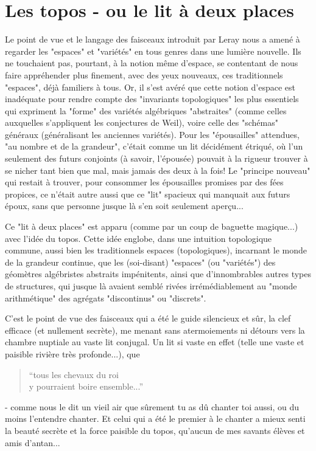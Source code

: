 \section{Les topos - ou le lit à deux places}

Le point de vue et le langage des faisceaux introduit par Leray nous a amené à regarder les "espaces" et "variétés" en tous genres dans une lumière nouvelle. Ils ne touchaient pas, pourtant, à la notion même d'espace, se contentant de nous faire appréhender plus finement, avec des yeux nouveaux, ces traditionnels "espaces", déjà familiers à tous. Or, il s'est avéré que cette notion d'espace est inadéquate pour rendre compte des "invariants topologiques" les plus essentiels qui expriment la "forme" des variétés algébriques "abstraites" (comme celles auxquelles s'appliquent les conjectures de Weil), voire celle des "schémas" généraux (généralisant les anciennes variétés). Pour les "épousailles" attendues, "au nombre et de la grandeur", c'était comme un lit décidément étriqué, où l'un seulement des futurs conjoints (à savoir, l'épousée) pouvait à la rigueur trouver à se nicher tant bien que mal, mais jamais des deux à la fois! Le "principe nouveau" qui restait à trouver, pour consommer les épousailles promises par des fées propices, ce n'était autre aussi que ce "lit" spacieux qui manquait aux futurs époux, sans que personne jusque là s'en soit seulement aperçu...

Ce "lit à deux places" est apparu (comme par un coup de baguette magique...) avec l'idée du topos. Cette idée englobe, dans une intuition topologique commune, aussi bien les traditionnels espaces (topologiques), incarnant le monde de la grandeur continue, que les (soi-disant) "espaces" (ou "variétés") des géomètres algébristes abstraits impénitents, ainsi que d'innombrables autres types de structures, qui jusque là avaient semblé rivées irrémédiablement au "monde arithmétique" des agrégats "discontinus" ou "discrets".

C'est le point de vue des faisceaux qui a été le guide silencieux et sûr, la clef efficace (et nullement secrète), me menant sans atermoiements ni détours vers la chambre nuptiale au vaste lit conjugal. Un lit si vaste en effet (telle une vaste et paisible rivière très profonde...), que
\begin{quote}
    ``tous les chevaux du roi\\
    y pourraient boire ensemble...''
    \end{quote}
- comme nous le dit un vieil air que sûrement tu as dû chanter toi aussi, ou du moins l'entendre chanter. Et celui qui a été le premier à le chanter a mieux senti la beauté secrète et la force paisible du topos, qu'aucun de mes savants élèves et amis d'antan...

